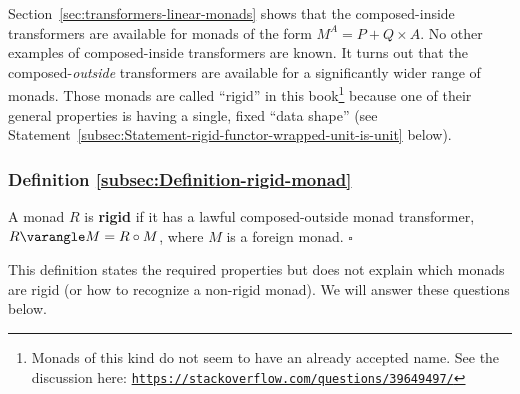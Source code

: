 Section~\ref{sec:transformers-linear-monads} shows that the composed-inside
transformers are available for monads of the
form $M^{A}=P+Q\times A$. No other examples of composed-inside transformers
are known. It turns out that the composed-\emph{outside} transformers
are available for a significantly wider range of monads. Those monads
are called \textsf{``}rigid\textsf{''} in this book\footnote{Monads of this kind do not seem to have an already accepted name.
See the discussion here: \texttt{\href{https://stackoverflow.com/questions/39649497/}{https://stackoverflow.com/questions/39649497/}}} because one of their general properties is having a single, fixed
\textsf{``}data shape\textsf{''} (see Statement~\ref{subsec:Statement-rigid-functor-wrapped-unit-is-unit}
below). 

\subsubsection{Definition \label{subsec:Definition-rigid-monad}\ref{subsec:Definition-rigid-monad}}

A monad $R$ is \textbf{rigid} if it has a lawful composed-outside
monad transformer, $R\varangle M=R\circ M$, where $M$ is a foreign
monad. $\square$

This definition states the required properties but does not explain
which monads are rigid (or how to recognize a non-rigid monad). We
will answer these questions below.

